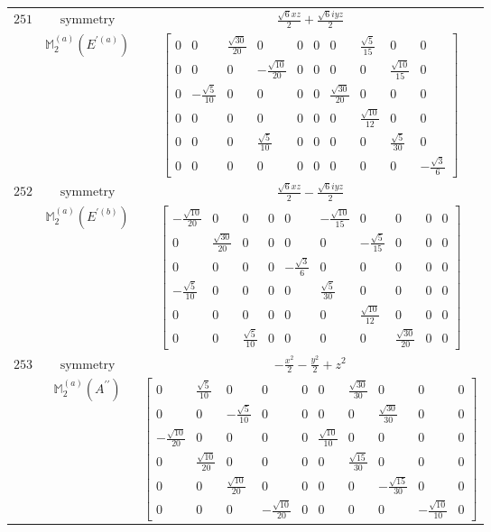\documentclass[fleqn,8pt,landscape]{jsarticle}
\begin{document}
\begin{longtable}{ccc}
$ 251 $ & $ \text{symmetry} $ & $ \frac{\sqrt{6} x z}{2} + \frac{\sqrt{6} i y z}{2} $ \\
$  $ & $ \mathbb{M}_{2}^{(a)}(E^{\prime(a)}) $ & $ \begin{bmatrix} 0 & 0 & \frac{\sqrt{30}}{20} & 0 & 0 & 0 & 0 & \frac{\sqrt{5}}{15} & 0 & 0 \\ 0 & 0 & 0 & - \frac{\sqrt{10}}{20} & 0 & 0 & 0 & 0 & \frac{\sqrt{10}}{15} & 0 \\ 0 & - \frac{\sqrt{5}}{10} & 0 & 0 & 0 & 0 & \frac{\sqrt{30}}{20} & 0 & 0 & 0 \\ 0 & 0 & 0 & 0 & 0 & 0 & 0 & \frac{\sqrt{10}}{12} & 0 & 0 \\ 0 & 0 & 0 & \frac{\sqrt{5}}{10} & 0 & 0 & 0 & 0 & \frac{\sqrt{5}}{30} & 0 \\ 0 & 0 & 0 & 0 & 0 & 0 & 0 & 0 & 0 & - \frac{\sqrt{3}}{6} \end{bmatrix} $ \\ \hline
$ 252 $ & $ \text{symmetry} $ & $ \frac{\sqrt{6} x z}{2} - \frac{\sqrt{6} i y z}{2} $ \\
$  $ & $ \mathbb{M}_{2}^{(a)}(E^{\prime(b)}) $ & $ \begin{bmatrix} - \frac{\sqrt{10}}{20} & 0 & 0 & 0 & 0 & - \frac{\sqrt{10}}{15} & 0 & 0 & 0 & 0 \\ 0 & \frac{\sqrt{30}}{20} & 0 & 0 & 0 & 0 & - \frac{\sqrt{5}}{15} & 0 & 0 & 0 \\ 0 & 0 & 0 & 0 & - \frac{\sqrt{3}}{6} & 0 & 0 & 0 & 0 & 0 \\ - \frac{\sqrt{5}}{10} & 0 & 0 & 0 & 0 & \frac{\sqrt{5}}{30} & 0 & 0 & 0 & 0 \\ 0 & 0 & 0 & 0 & 0 & 0 & \frac{\sqrt{10}}{12} & 0 & 0 & 0 \\ 0 & 0 & \frac{\sqrt{5}}{10} & 0 & 0 & 0 & 0 & \frac{\sqrt{30}}{20} & 0 & 0 \end{bmatrix} $ \\ \hline
$ 253 $ & $ \text{symmetry} $ & $ - \frac{x^{2}}{2} - \frac{y^{2}}{2} + z^{2} $ \\
$  $ & $ \mathbb{M}_{2}^{(a)}(A^{\prime\prime}) $ & $ \begin{bmatrix} 0 & \frac{\sqrt{5}}{10} & 0 & 0 & 0 & 0 & \frac{\sqrt{30}}{30} & 0 & 0 & 0 \\ 0 & 0 & - \frac{\sqrt{5}}{10} & 0 & 0 & 0 & 0 & \frac{\sqrt{30}}{30} & 0 & 0 \\ - \frac{\sqrt{10}}{20} & 0 & 0 & 0 & 0 & \frac{\sqrt{10}}{10} & 0 & 0 & 0 & 0 \\ 0 & \frac{\sqrt{10}}{20} & 0 & 0 & 0 & 0 & \frac{\sqrt{15}}{30} & 0 & 0 & 0 \\ 0 & 0 & \frac{\sqrt{10}}{20} & 0 & 0 & 0 & 0 & - \frac{\sqrt{15}}{30} & 0 & 0 \\ 0 & 0 & 0 & - \frac{\sqrt{10}}{20} & 0 & 0 & 0 & 0 & - \frac{\sqrt{10}}{10} & 0 \end{bmatrix} $ \\ \hline

\end{longtable}
\end{document}
